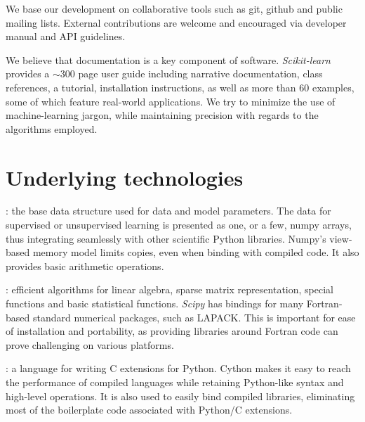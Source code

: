 \documentclass[twoside,11pt]{article}
\begin{document}
\smallskip
{}
%
We base our development on collaborative tools such as git, github and
public mailing lists. External contributions are welcome and
encouraged via developer manual and API guidelines.

\smallskip {}
%
We believe that documentation is a key component of software.
\emph{Scikit-learn} provides a $\sim$300 page user guide including
narrative documentation, class references, a tutorial, installation
instructions, as well as more than 60 examples, some of which feature
real-world applications. We try to minimize the use of
machine-learning jargon, while maintaining precision with
regards to the algorithms employed.


\section{Underlying technologies}



:
%
the base data structure used for data and model parameters.
The data for supervised or unsupervised learning is
presented as one, or a few, numpy arrays, thus integrating seamlessly
with other scientific Python libraries. Numpy's view-based memory
model limits copies, even when binding with compiled code. It also
provides basic arithmetic operations.

\smallskip
{}:
%
%
efficient algorithms for linear algebra, sparse matrix representation,
special functions and basic statistical functions. {\sl Scipy} has
bindings for many Fortran-based standard numerical packages, such as
LAPACK. This is important for ease of installation and portability, as
providing libraries around Fortran code can prove challenging on
various platforms.

\smallskip
{}:
%
a language for writing C extensions for Python. Cython makes it easy to
reach the performance of compiled languages while retaining
Python-like syntax and high-level operations. It is also used to
easily bind compiled libraries, eliminating most of the boilerplate code
associated with Python/C extensions.
\end{document}
